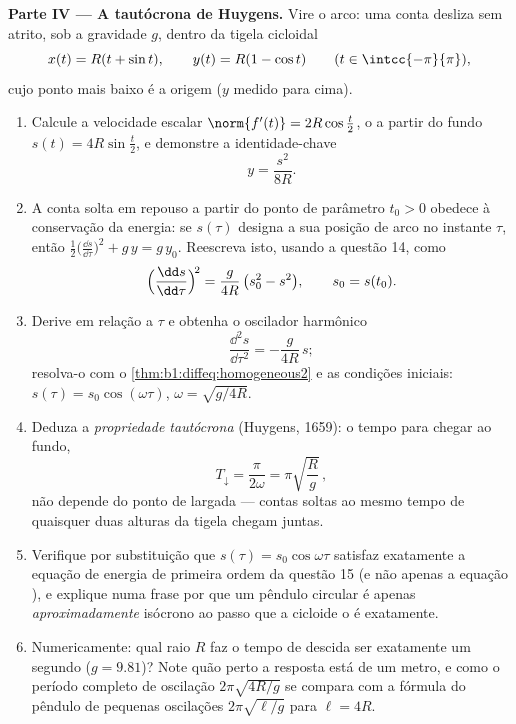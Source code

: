 \begin{problem}
\medskip
\noindent\textbf{Parte IV --- A tautócrona de Huygens.} Vire o arco:
uma conta desliza sem atrito, sob a gravidade $g$, dentro da tigela
cicloidal
\[
x(t) = R(t + \sin t), \qquad y(t) = R(1 - \cos t)
\qquad (t \in \intcc{-\pi}{\pi}),
\]
cujo ponto mais baixo é a origem ($y$ medido para cima).
\begin{enumerate}[resume]
  \item Calcule a velocidade escalar $\norm{f'(t)} = 2R\cos\frac t2$, o  a
        partir do fundo $s(t) = 4R\sin\frac t2$, e demonstre a identidade-chave
        \[
        y = \frac{s^2}{8R} .
        \]
  \item A conta solta em repouso a partir do ponto de parâmetro
        $t_0 > 0$ obedece à conservação da energia: se $s(\tau)$
        designa a sua posição de arco no instante $\tau$, então
        $\frac12\bigl(
        \frac{\dd s}{\dd\tau}\bigr)^2 + g\,y = g\,y_0$. Reescreva isto, usando a questão 14, como
        \[
        \Bigl(\frac{\dd s}{\dd\tau}\Bigr)^{\!2}
        = \frac{g}{4R}\,\bigl(s_0^2 - s^2\bigr),
        \qquad s_0 = s(t_0).
        \]
  \item Derive em relação a $\tau$ e obtenha o oscilador harmônico
        \[
        \frac{\dd^2 s}{\dd\tau^2} = -\frac{g}{4R}\,s ;
        \]
        resolva-o com o \cref{thm:b1:diffeq:homogeneous2} e as condições iniciais: $s(\tau) = s_0\cos(\omega\tau)$, $\omega = \sqrt{g/4R}$.
  \item Deduza a \emph{propriedade tautócrona} (Huygens, 1659): o
        tempo para chegar ao fundo,
        \[
        T_{\downarrow} = \frac{\pi}{2\omega}
        = \pi\sqrt{\frac Rg}\,,
        \]
        não depende do ponto de largada --- contas soltas ao mesmo
        tempo de quaisquer duas alturas da tigela chegam juntas.
  \item Verifique por substituição que $s(\tau) =
        s_0\cos\omega\tau$ satisfaz exatamente a
        equação de energia de primeira ordem da questão 15 (e não
        apenas a equação ), e explique numa frase por que um
        pêndulo circular é apenas \emph{aproximadamente} isócrono ao
        passo que a cicloide o é exatamente.
  \item Numericamente: qual raio $R$ faz o tempo de descida ser
        exatamente um segundo ($g = 9.81$)? Note quão perto a resposta
        está de um metro, e como o período completo de oscilação
        $2\pi\sqrt{4R/g}$ se compara com a fórmula do pêndulo de pequenas
        oscilações $2\pi\sqrt{\ell/g}$ para $\ell = 4R$.
\end{enumerate}


\end{problem}
